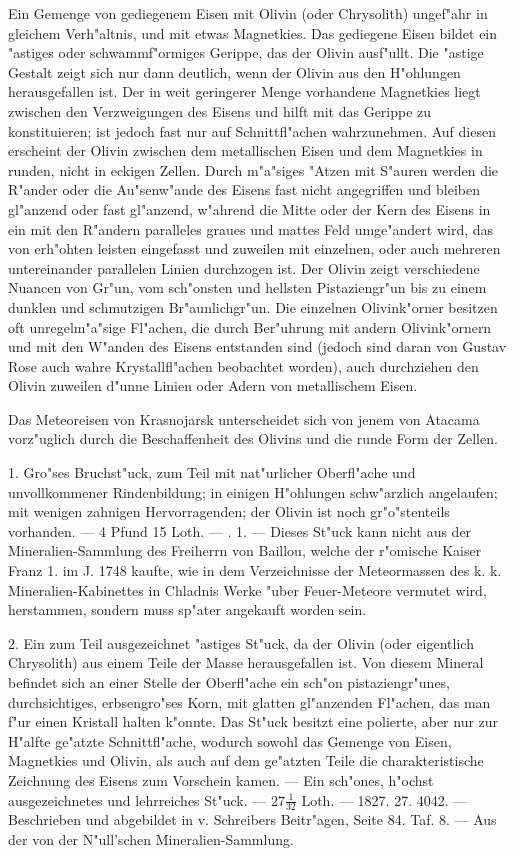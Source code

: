 \documentclass[a4paper, 11pt, oneside, polutonikogreek, german]{article}
\begin{document}
Ein Gemenge von gediegenem Eisen mit Olivin (oder Chrysolith) ungef"ahr in gleichem Verh"altnis, und mit etwas Magnetkies. Das gediegene Eisen bildet ein "astiges oder schwammf"ormiges Gerippe, das der Olivin ausf"ullt. Die "astige Gestalt zeigt sich nur dann deutlich, wenn der Olivin aus den H"ohlungen herausgefallen ist. Der in weit geringerer Menge vorhandene Magnetkies liegt zwischen den Verzweigungen des Eisens und hilft mit das Gerippe zu konstituieren; ist jedoch fast nur auf Schnittfl"achen wahrzunehmen. Auf diesen erscheint der Olivin zwischen dem metallischen Eisen und dem Magnetkies in runden, nicht in eckigen Zellen. Durch m"a"siges "Atzen mit S"auren werden die R"ander oder die Au"senw"ande des Eisens fast nicht angegriffen und bleiben gl"anzend oder fast gl"anzend, w"ahrend die Mitte oder der Kern des Eisens in ein mit den R"andern paralleles graues und mattes Feld umge"andert wird, das von erh"ohten leisten eingefasst und zuweilen mit einzelnen, oder auch mehreren untereinander parallelen Linien durchzogen ist. Der Olivin zeigt verschiedene Nuancen von Gr"un, vom sch"onsten und hellsten Pistaziengr"un bis zu einem dunklen und schmutzigen Br"aunlichgr"un. Die einzelnen Olivink"orner besitzen oft unregelm"a"sige Fl"achen, die durch Ber"uhrung mit andern Olivink"ornern und mit den W"anden des Eisens entstanden sind (jedoch sind daran von Gustav Rose auch wahre Krystallfl"achen beobachtet worden), auch durchziehen den Olivin zuweilen d"unne Linien oder Adern von metallischem Eisen.

Das Meteoreisen von Krasnojarsk unterscheidet sich von jenem von Atacama vorz"uglich durch die Beschaffenheit des Olivins und die runde Form der Zellen.

1. Gro"ses Bruchst"uck, zum Teil mit nat"urlicher Oberfl"ache und unvollkommener Rindenbildung; in einigen H"ohlungen schw"arzlich angelaufen; mit wenigen zahnigen Hervorragenden; der Olivin ist noch gr"o"stenteils vorhanden. --- 4 Pfund 15 Loth. --- . 1. --- Dieses St"uck kann nicht aus der Mineralien-Sammlung des Freiherrn von Baillou, welche der r"omische Kaiser Franz 1. im J. 1748 kaufte, wie in dem Verzeichnisse der Meteormassen des k. k. Mineralien-Kabinettes in Chladnis Werke "uber Feuer-Meteore vermutet wird, herstammen, sondern muss sp"ater angekauft worden sein.

2. Ein zum Teil ausgezeichnet "astiges St"uck, da der Olivin (oder eigentlich Chrysolith) aus einem Teile der Masse herausgefallen ist. Von diesem Mineral befindet sich an einer Stelle der Oberfl"ache ein sch"on pistaziengr"unes, durchsichtiges, erbsengro"ses Korn, mit glatten gl"anzenden Fl"achen, das man f"ur einen Kristall halten k"onnte. Das St"uck besitzt eine polierte, aber nur zur H"alfte ge"atzte Schnittfl"ache, wodurch sowohl das Gemenge von Eisen, Magnetkies und Olivin, als auch auf dem ge"atzten Teile die charakteristische Zeichnung des Eisens zum Vorschein kamen. --- Ein sch"ones, h"ochst ausgezeichnetes und lehrreiches St"uck. --- $27\frac{1}{32}$ Loth. --- 1827. 27. 4042. --- Beschrieben und abgebildet in v. Schreibers Beitr"agen, Seite 84. Taf. 8. --- Aus der von der N"ull'schen Mineralien-Sammlung.
\end{document}
